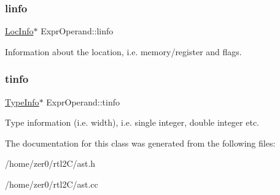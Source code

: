 \subsubsection{\texorpdfstring{linfo}{linfo}}
{\footnotesize\ttfamily \hyperlink{class_loc_info}{Loc\+Info}$\ast$ Expr\+Operand\+::linfo\hspace{0.3cm}{\ttfamily [protected]}}

Information about the location, i.\+e. memory/register and flags. \mbox{\label{class_expr_operand_a30dfef7cd9e9d56a9a02f48080785ab3}} 
\subsubsection{\texorpdfstring{tinfo}{tinfo}}
{\footnotesize\ttfamily \hyperlink{class_type_info}{Type\+Info}$\ast$ Expr\+Operand\+::tinfo\hspace{0.3cm}{\ttfamily [protected]}}

Type information (i.\+e. width), i.\+e. single integer, double integer etc. 

The documentation for this class was generated from the following files\+:\begin{DoxyCompactItemize}
\item 
/home/zer0/rtl2\+C/ast.\+h\item 
/home/zer0/rtl2\+C/ast.\+cc\end{DoxyCompactItemize}
